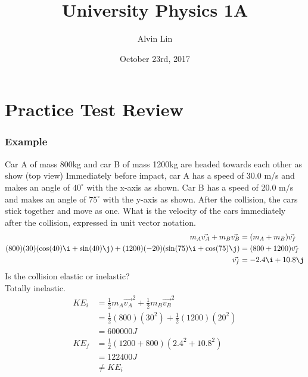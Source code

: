 \documentclass[letterpaper, 12pt]{math}
\title{University Physics 1A}
\author{Alvin Lin}
\date{October 23rd, 2017}
\begin{document}
\maketitle

\section*{Practice Test Review}

\subsubsection*{Example}
Car A of mass 800kg and car B of mass 1200kg are headed towards each other as
show (top view) Immediately before impact, car A has a speed of 30.0 m/s and
makes an angle of \( 40^{\circ} \) with the x-axis as shown. Car B has a speed
of 20.0 m/s and makes an angle of \( 75^{\circ} \) with the y-axis as shown.
After the collision, the cars stick together and move as one. What is the
velocity of the cars immediately after the collision, expressed in unit vector
notation.
\begin{align*}
  m_A\vec{v_A}+m_B\vec{v_B} &= (m_A+m_B)\vec{v_f} \\
  (800)(30)(\cos(40)\i+\sin(40)\j)+(1200)(-20)(\sin(75)\i+\cos(75)\j) &=
    (800+1200)\vec{v_f} \\
  \vec{v_f} &= -2.4\i+10.8\j
\end{align*}
Is the collision elastic or inelastic? \\
Totally inelastic.
\begin{align*}
  KE_i &= \frac{1}{2}m_A\vec{v_A}^2+\frac{1}{2}m_B\vec{v_B}^2 \\
  &= \frac{1}{2}(800)(30^2)+\frac{1}{2}(1200)(20^2) \\
  &= 600000J \\
  KE_f &= \frac{1}{2}(1200+800)(2.4^2+10.8^2) \\
  &= 122400J \\
  &\ne KE_i
\end{align*}
\end{document}
